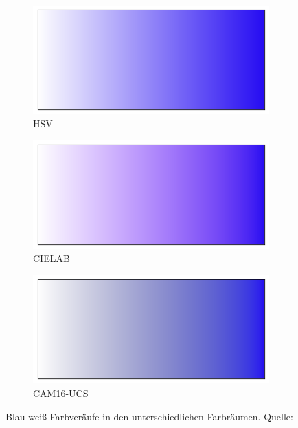 \documentclass[12pt, a4paper, ngerman]{article}
\begin{document}
\begin{figure}
  \begin{subfigure}[b]{0.3\linewidth}
    \includegraphics[width=\linewidth]{Grafiken/Vergleich_Farbverlauf/hsv_blend.png}
    \caption{HSV}
    \label{fig:blend_hsv}
  \end{subfigure}
  \begin{subfigure}[b]{0.3\linewidth}
    \includegraphics[width=\linewidth]{Grafiken/Vergleich_Farbverlauf/cielab_blend.png}
    \caption{CIELAB}
    \label{fig:blend_cielab}
  \end{subfigure}
  \begin{subfigure}[b]{0.3\linewidth}
    \includegraphics[width=\linewidth]{Grafiken/Vergleich_Farbverlauf/cam16_blend.png}
    \caption{CAM16-UCS}
    \label{fig:blend_cam}
  \end{subfigure}

  \caption{Blau-weiß Farbveräufe in den unterschiedlichen Farbräumen. Quelle: ~\cite{Oklab_2020}}
  \label{fig:blend_comp}
\end{figure}
\end{document}
